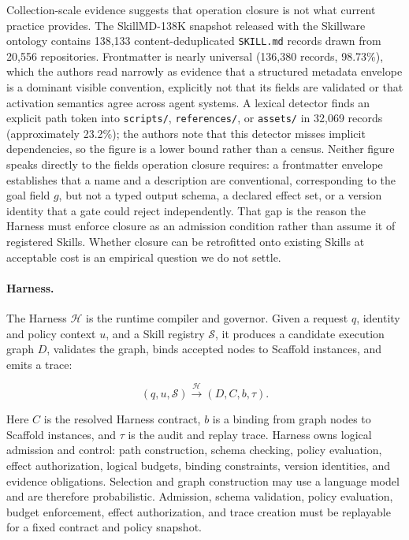Collection-scale evidence suggests that operation closure is not what current practice provides. The SkillMD-138K snapshot released with the Skillware ontology \cite{fan2026skillware} contains 138,133 content-deduplicated \texttt{SKILL.md} records drawn from 20,556 repositories. Frontmatter is nearly universal (136,380 records, 98.73\%), which the authors read narrowly as evidence that a structured metadata envelope is a dominant visible convention, explicitly not that its fields are validated or that activation semantics agree across agent systems. A lexical detector finds an explicit path token into \texttt{scripts/}, \texttt{references/}, or \texttt{assets/} in 32,069 records (approximately 23.2\%); the authors note that this detector misses implicit dependencies, so the figure is a lower bound rather than a census. Neither figure speaks directly to the fields operation closure requires: a frontmatter envelope establishes that a name and a description are conventional, corresponding to the goal field $g$, but not a typed output schema, a declared effect set, or a version identity that a gate could reject independently. That gap is the reason the Harness must enforce closure as an admission condition rather than assume it of registered Skills. Whether closure can be retrofitted onto existing Skills at acceptable cost is an empirical question we do not settle.

\paragraph{Harness.}
The Harness $\mathcal{H}$ is the runtime compiler and governor. Given a request $q$, identity and policy context $u$, and a Skill registry $\mathcal{S}$, it produces a candidate execution graph $D$, validates the graph, binds accepted nodes to Scaffold instances, and emits a trace:

\begin{equation}
(q,u,\mathcal{S}) \xrightarrow{\mathcal{H}} (D,C,b,\tau).
\end{equation}

Here $C$ is the resolved Harness contract, $b$ is a binding from graph nodes to Scaffold instances, and $\tau$ is the audit and replay trace. Harness owns logical admission and control: path construction, schema checking, policy evaluation, effect authorization, logical budgets, binding constraints, version identities, and evidence obligations. Selection and graph construction may use a language model and are therefore probabilistic. Admission, schema validation, policy evaluation, budget enforcement, effect authorization, and trace creation must be replayable for a fixed contract and policy snapshot.

